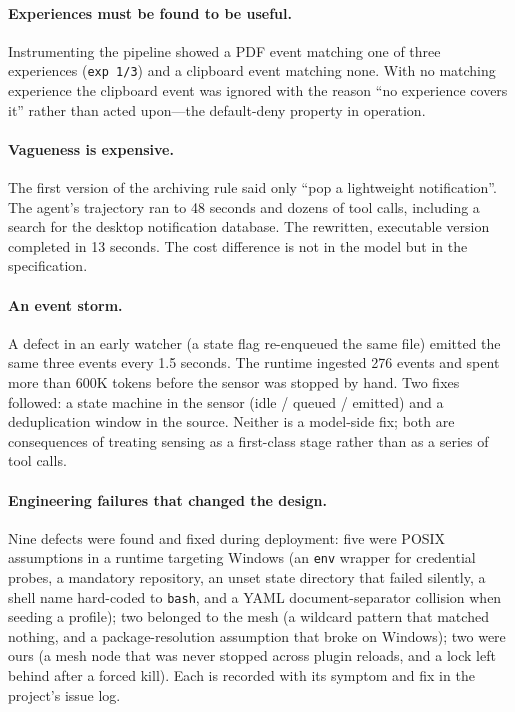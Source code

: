 \documentclass[10pt,a4paper]{article}
\begin{document}
\paragraph{Experiences must be found to be useful.}
Instrumenting the pipeline showed a PDF event matching one of three
experiences (\texttt{exp 1/3}) and a clipboard event matching none. With no
matching experience the clipboard event was ignored with the reason ``no
experience covers it'' rather than acted upon---the default-deny property in
operation.

\paragraph{Vagueness is expensive.}
The first version of the archiving rule said only ``pop a lightweight
notification''. The agent's trajectory ran to 48 seconds and dozens of tool
calls, including a search for the desktop notification database. The
rewritten, executable version completed in 13 seconds. The cost difference is
not in the model but in the specification.

\paragraph{An event storm.}
A defect in an early watcher (a state flag re-enqueued the same file) emitted
the same three events every 1.5 seconds. The runtime ingested 276 events and
spent more than 600K tokens before the sensor was stopped by hand. Two fixes
followed: a state machine in the sensor (idle / queued / emitted) and a
deduplication window in the source. Neither is a model-side fix; both are
consequences of treating sensing as a first-class stage rather than as a
series of tool calls.

\paragraph{Engineering failures that changed the design.}
Nine defects were found and fixed during deployment: five were POSIX
assumptions in a runtime targeting Windows (an \texttt{env} wrapper for
credential probes, a mandatory repository, an unset state directory that
failed silently, a shell name hard-coded to \texttt{bash}, and a YAML
document-separator collision when seeding a profile); two belonged to the
mesh (a wildcard pattern that matched nothing, and a package-resolution
assumption that broke on Windows); two were ours (a mesh node that was never
stopped across plugin reloads, and a lock left behind after a forced kill).
Each is recorded with its symptom and fix in the project's issue log.
\end{document}
